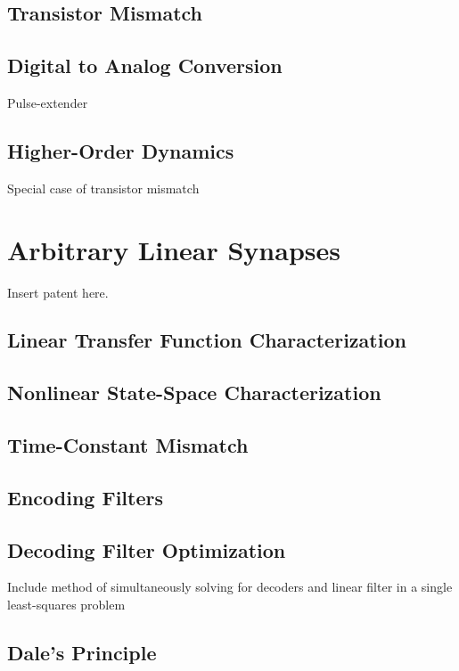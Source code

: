 \subsection{Transistor Mismatch}

\subsection{Digital to Analog Conversion}

Pulse-extender

\subsection{Higher-Order Dynamics}

Special case of transistor mismatch


\section{Arbitrary Linear Synapses}

Insert patent here.

\subsection{Linear Transfer Function Characterization}

\subsection{Nonlinear State-Space Characterization}

\subsection{Time-Constant Mismatch}

\subsection{Encoding Filters}

\subsection{Decoding Filter Optimization}

Include method of simultaneously solving for decoders and linear filter in a single least-squares problem

\subsection{Dale's Principle}


